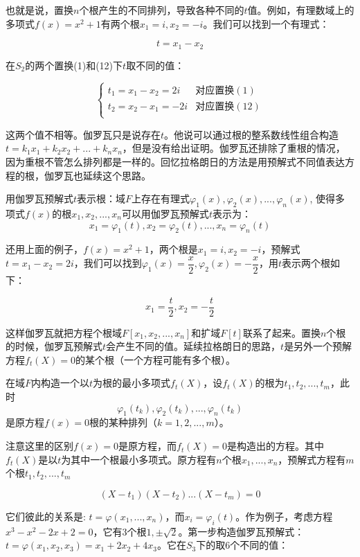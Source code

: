 \documentclass[b5paper]{ctexart}
\begin{document}
也就是说，置换$n$个根产生的不同排列，导致各种不同的$t$值。例如，有理数域上的多项式$f(x) = x^2 + 1$有两个根$x_1 = i, x_2 = -i$。我们可以找到一个有理式：

\[
t = x_1 - x_2
\]

在$S_2$的两个置换(1)和(12)下$t$取不同的值：

\[
\begin{cases}
t_1 = x_1 - x_2 = 2i & \text{对应置换} (1) \\
t_2 = x_2 - x_1 = -2i & \text{对应置换} (12) \\
\end{cases}
\]

这两个值不相等。伽罗瓦只是说存在$t$。他说可以通过根的整系数线性组合构造$t = k_1x_1 + k_2x_2 + ... + k_nx_n$，但是没有给出证明。伽罗瓦还排除了重根的情况，因为重根不管怎么排列都是一样的。回忆拉格朗日的方法是用预解式不同值表达方程的根，伽罗瓦也延续这个思路。

\begin{lemma}用伽罗瓦预解式$t$表示根：域$F$上存在有理式$\varphi_1(x), \varphi_2(x), ..., \varphi_n(x)$, 使得多项式$f(x)$的根$x_1, x_2, ..., x_n$可以用伽罗瓦预解式$t$表示为：
\[
x_1 = \varphi_1(t), x_2 = \varphi_2(t), ..., x_n = \varphi_n(t)
\]
\end{lemma}

还用上面的例子，$f(x) = x^2 + 1$，两个根是$x_1 = i, x_2 = -i$，预解式$t = x_1 - x_2 = 2i$，我们可以找到$\varphi_1(x) = \dfrac{x}{2}, \varphi_2(x) = -\dfrac{x}{2}$，用$t$表示两个根如下：

\[
x_1 = \dfrac{t}{2}, x_2 = -\dfrac{t}{2}
\]

这样伽罗瓦就把方程个根域$F[x_1, x_2, ..., x_n]$和扩域$F[t]$联系了起来。置换$n$个根的时候，伽罗瓦预解式$t$会产生不同的值。延续拉格朗日的思路，$t$是另外一个预解方程$f_t(X) = 0$的某个根（一个方程可能有多个根）。

\begin{lemma}
在域$F$内构造一个以$t$为根的最小多项式$f_t(X)$，设$f_t(X)$的根为$t_1, t_2, ..., t_m$，此时
\[
\varphi_1(t_k), \varphi_2(t_k), ..., \varphi_n(t_k)
\]
是原方程$f(x) = 0$根的某种排列（$k = 1, 2, ..., m$）。
\end{lemma}

注意这里的区别$f(x) = 0$是原方程，而$f_t(X) = 0$是构造出的方程。其中$f_t(X)$是以$t$为其中一个根最小多项式。原方程有$n$个根$x_1, ..., x_n$，预解式方程有$m$个根$t_1, t_2, ..., t_m$

\[
(X - t_1)(X - t_2)...(X - t_m) = 0
\]

它们彼此的关系是: $t = \varphi(x_1, ..., x_n)$，而$x_i = \varphi_i(t)$。作为例子，考虑方程$x^3 - x^2 - 2x + 2 = 0$，它有3个根$1, \pm \sqrt{2}$。第一步构造伽罗瓦预解式：$t = \varphi(x_1, x_2, x_3) = x_1 + 2x_2 + 4x_3$。它在$S_3$下的取6个不同的值：
\end{document}
